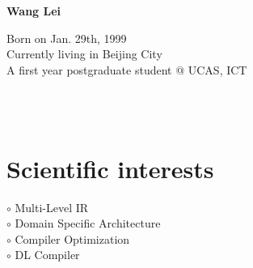 \documentclass[a4paper,10pt]{article}
\begin{document}
\thispagestyle{empty}

\begin{adjustbox}{valign=t}
\begin{minipage}{0.3\textwidth} %
\begin{center}

\MySkip 	%

{\LARGE \bfseries Wang Lei}

\MySkip 	%

Born on Jan. 29th, 1999\\

Currently living in Beijing City\\

A first year postgraduate student @ UCAS, ICT

\MySkip 	%

\textcolor{ColorTwo}{\faGithub} 
 \\


\textcolor{ColorTwo}{\faChain} 
 \\

\textcolor{ColorTwo}{\faEnvelopeO} 

\end{center}

\vfill

\section*{Scientific interests}
\raggedright
\textcolor{ColorOne}{$\circ$} Multi-Level IR \\
\textcolor{ColorOne}{$\circ$} Domain Specific Architecture \\
\textcolor{ColorOne}{$\circ$} Compiler Optimization\\
\textcolor{ColorOne}{$\circ$} DL Compiler


\end{minipage}
\end{adjustbox}
\end{document}
